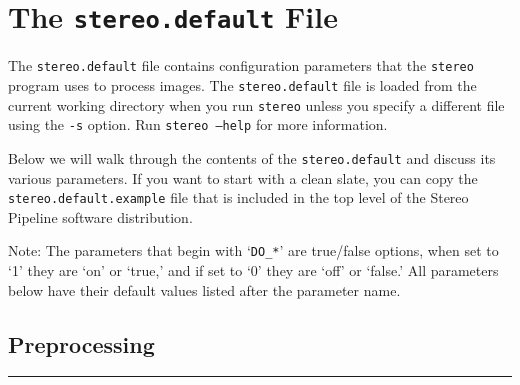 \chapter{The {\tt stereo.default} File}
\label{ch:stereodefault}

The \texttt{stereo.default} file contains configuration parameters
that the \texttt{stereo} program uses to process images.  The
\texttt{stereo.default} file is loaded from the current working
directory when you run \texttt{stereo} unless you specify a different
file using the \texttt{-s} option.  Run \texttt{stereo --help} for
more information.

Below we will walk through the contents of the \texttt{stereo.default}
and discuss its various parameters.  If you want to start with a clean
slate, you can copy the \texttt{stereo.default.example} file that is
included in the top level of the Stereo Pipeline software distribution.

Note: The parameters that begin with `\texttt{DO\_*}' are true/false
options, when set to `1' they are `on' or `true,' and if set to `0'
they are `off' or `false.'  All parameters below have their default
values listed after the parameter name.


\section{Preprocessing}
\hrule
\bigskip

